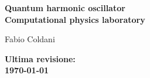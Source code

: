\begin{titlepage}
  \begin{center}
    {\LARGE{\bf Quantum harmonic oscillator }}\\
  	\vspace{5mm}
  	\textbf{Computational physics laboratory}\\
  	\vspace{15mm}
  \end{center}
\vspace{36mm}

\begin{minipage}[t]{0.47\textwidth}
  {\large{Fabio Coldani}}
\end{minipage}\hfill\begin{minipage}[t]{0.47\textwidth}\raggedleft
	{\large{\bf Ultima revisione: \\ \today}}
\end{minipage}

\vspace{18mm}


\end{titlepage}

